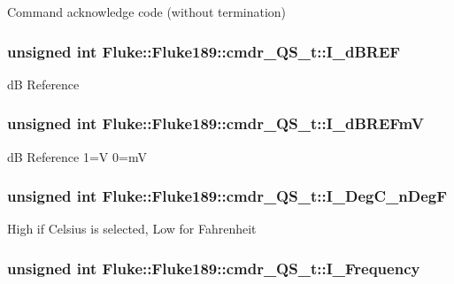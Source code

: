 \label{structFluke_1_1Fluke189_1_1cmdr__QS__t_af806a40dd2e31a0cddaca3cfcf2614ce}
Command acknowledge code (without termination) \hypertarget{structFluke_1_1Fluke189_1_1cmdr__QS__t_a1fef762e7d744e9b1a5be9d8adfbb201}{
\subsubsection[{I\_\-dBREF}]{\setlength{\rightskip}{0pt plus 5cm}unsigned int {\bf Fluke::Fluke189::cmdr\_\-QS\_\-t::I\_\-dBREF}}}
\label{structFluke_1_1Fluke189_1_1cmdr__QS__t_a1fef762e7d744e9b1a5be9d8adfbb201}
dB Reference \hypertarget{structFluke_1_1Fluke189_1_1cmdr__QS__t_a89c8364bd224da97ba1611dc031cdb17}{
\subsubsection[{I\_\-dBREFmV}]{\setlength{\rightskip}{0pt plus 5cm}unsigned int {\bf Fluke::Fluke189::cmdr\_\-QS\_\-t::I\_\-dBREFmV}}}
\label{structFluke_1_1Fluke189_1_1cmdr__QS__t_a89c8364bd224da97ba1611dc031cdb17}
dB Reference 1=V 0=mV \hypertarget{structFluke_1_1Fluke189_1_1cmdr__QS__t_a7367ebde9a073bee60d85dd03e24297c}{
\subsubsection[{I\_\-DegC\_\-nDegF}]{\setlength{\rightskip}{0pt plus 5cm}unsigned int {\bf Fluke::Fluke189::cmdr\_\-QS\_\-t::I\_\-DegC\_\-nDegF}}}
\label{structFluke_1_1Fluke189_1_1cmdr__QS__t_a7367ebde9a073bee60d85dd03e24297c}
High if Celsius is selected, Low for Fahrenheit \hypertarget{structFluke_1_1Fluke189_1_1cmdr__QS__t_abe993a772a9e7e60e8544d3a3eab3285}{
\subsubsection[{I\_\-Frequency}]{\setlength{\rightskip}{0pt plus 5cm}unsigned int {\bf Fluke::Fluke189::cmdr\_\-QS\_\-t::I\_\-Frequency}}}
